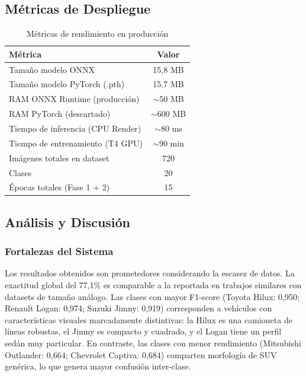 \documentclass[12pt,a4paper]{article}
\begin{document}
\subsection{Métricas de Despliegue}

\begin{table}[H]
\centering
\caption{Métricas de rendimiento en producción}
\label{tab:deployment}
\begin{tabular}{lc}
\toprule
\textbf{Métrica} & \textbf{Valor} \\
\midrule
Tamaño modelo ONNX         & 15,8 MB \\
Tamaño modelo PyTorch (.pth) & 15,7 MB \\
RAM ONNX Runtime (producción) & $\sim$50 MB \\
RAM PyTorch (descartado)      & $\sim$600 MB \\
Tiempo de inferencia (CPU Render) & $\sim$80 ms \\
Tiempo de entrenamiento (T4 GPU) & $\sim$90 min \\
Imágenes totales en dataset  & 720 \\
Clases                       & 20 \\
Épocas totales (Fase 1 + 2)  & 15 \\
\bottomrule
\end{tabular}
\end{table}

\subsection{Análisis y Discusión}

\subsubsection{Fortalezas del Sistema}

Los resultados obtenidos son prometedores considerando la escasez de datos. La exactitud global del 77,1\% es comparable a la reportada en trabajos similares con datasets de tamaño análogo. Las clases con mayor F1-score (Toyota Hilux: 0,950; Renault Logan: 0,974; Suzuki Jimny: 0,919) corresponden a vehículos con características visuales marcadamente distintivas: la Hilux es una camioneta de líneas robustas, el Jimny es compacto y cuadrado, y el Logan tiene un perfil sedán muy particular. En contraste, las clases con menor rendimiento (Mitsubishi Outlander: 0,664; Chevrolet Captiva: 0,684) comparten morfología de SUV genérica, lo que genera mayor confusión inter-clase.
\end{document}
